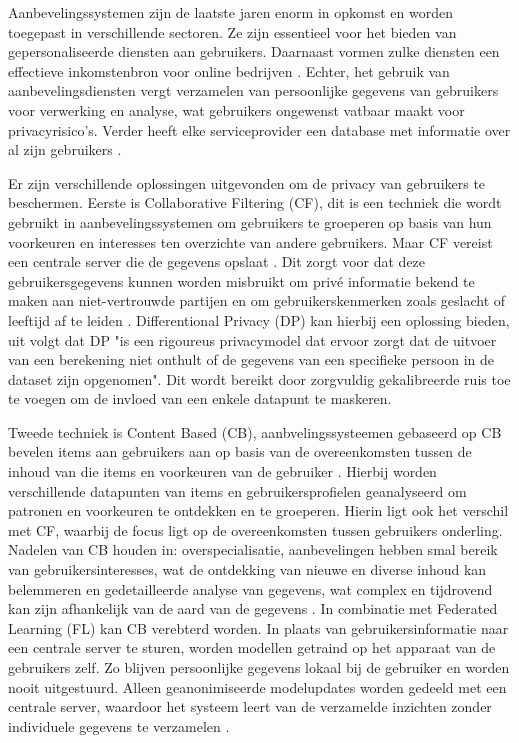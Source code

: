Aanbevelingssystemen zijn de laatste jaren enorm in opkomst en worden toegepast in verschillende sectoren. Ze zijn essentieel voor het bieden van gepersonaliseerde diensten aan gebruikers. Daarnaast vormen zulke diensten een effectieve inkomstenbron voor online bedrijven \autocite{Mazeh2020, Wang2018}. Echter, het gebruik van aanbevelingsdiensten vergt verzamelen van persoonlijke gegevens van gebruikers voor verwerking en analyse, wat gebruikers ongewenst vatbaar maakt voor privacyrisico's. Verder heeft elke serviceprovider een database met informatie over al zijn gebruikers \autocite{Wang2018, Lex2023, Yang2020, Friedman2015}.

Er zijn verschillende oplossingen uitgevonden om de privacy van gebruikers te beschermen. Eerste is Collaborative Filtering (CF), dit is een techniek die wordt gebruikt in aanbevelingssystemen om gebruikers te groeperen op basis van hun voorkeuren en interesses ten overzichte van andere gebruikers. Maar CF vereist een centrale server die de gegevens opslaat \autocite{Li2017,Wang2018}. Dit zorgt voor dat deze gebruikersgegevens kunnen worden misbruikt om privé informatie bekend te maken aan niet-vertrouwde partijen en om gebruikerskenmerken zoals geslacht of leeftijd af te leiden \autocite{Lex2023}. 
Differentional Privacy (DP) kan hierbij een oplossing bieden, uit \textcite{Friedman2015,Lex2023} volgt dat DP "is een rigoureus privacymodel dat ervoor zorgt dat de uitvoer van een berekening niet onthult of de gegevens van een specifieke persoon in de dataset zijn opgenomen". Dit wordt bereikt door zorgvuldig gekalibreerde ruis toe te voegen om de invloed van een enkele datapunt te maskeren.

Tweede techniek is Content Based (CB), aanbvelingssysteemen gebaseerd op CB bevelen items aan gebruikers aan op basis van de overeenkomsten tussen de inhoud van die items en voorkeuren van de gebruiker \autocite{Lops2010,Pazzani2007}. Hierbij worden verschillende datapunten van items en gebruikersprofielen geanalyseerd om patronen en voorkeuren te ontdekken en te groeperen. Hierin ligt ook het verschil met CF, waarbij de focus ligt op de overeenkomsten tussen gebruikers onderling. Nadelen van CB houden in: overspecialisatie, aanbevelingen hebben smal bereik van gebruikersinteresses, wat de ontdekking van nieuwe en diverse inhoud kan belemmeren en gedetailleerde analyse van gegevens, wat complex en tijdrovend kan zijn afhankelijk van de aard van de gegevens \autocite{Patel2020,Lops2010}.
In combinatie met Federated Learning (FL) kan CB verebterd worden. In plaats van gebruikersinformatie naar een centrale server te sturen, worden modellen getraind op het apparaat van de gebruikers zelf. Zo blijven persoonlijke gegevens lokaal bij de gebruiker en worden nooit uitgestuurd. Alleen geanonimiseerde modelupdates worden gedeeld met een centrale server, waardoor het systeem leert van de verzamelde inzichten zonder individuele gegevens te verzamelen \autocite{Wang2018, Lops2010}.

